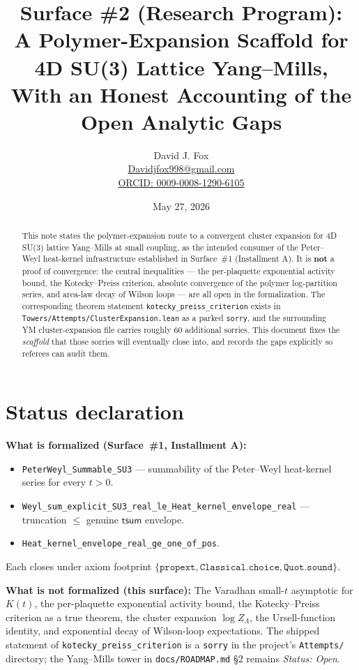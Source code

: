 \documentclass{article}
\title{Surface \#2 (Research Program):\\
A Polymer-Expansion Scaffold for 4D SU(3) Lattice Yang--Mills,\\
With an Honest Accounting of the Open Analytic Gaps}
\author{David J. Fox \\
\href{mailto:Davidjfox998@gmail.com}{Davidjfox998@gmail.com} \\
\href{https://orcid.org/0009-0008-1290-6105}{ORCID: 0009-0008-1290-6105}}
\date{May 27, 2026}
\begin{document}
\maketitle

\begin{abstract}
This note states the polymer-expansion route to a convergent cluster
expansion for 4D SU(3) lattice Yang--Mills at small coupling, as the
intended consumer of the Peter--Weyl heat-kernel infrastructure
established in Surface~\#1 (Installment A). It is \textbf{not} a
proof of convergence: the central inequalities --- the per-plaquette
exponential activity bound, the Kotecky--Preiss criterion, absolute
convergence of the polymer log-partition series, and area-law decay
of Wilson loops --- are all open in the formalization. The
corresponding theorem statement \texttt{kotecky\_preiss\_criterion}
exists in \texttt{Towers/Attempts/ClusterExpansion.lean} as a
parked \texttt{sorry}, and the surrounding YM cluster-expansion file
carries roughly 60 additional sorries. This document fixes the
\emph{scaffold} that those sorries will eventually close into, and
records the gaps explicitly so referees can audit them.
\end{abstract}

\section{Status declaration}

\noindent\textbf{What is formalized (Surface~\#1, Installment A):}
\begin{itemize}
  \item \texttt{PeterWeyl\_Summable\_SU3} --- summability of the
        Peter--Weyl heat-kernel series for every $t>0$.
  \item \texttt{Weyl\_sum\_explicit\_SU3\_real\_le\_Heat\_kernel\_envelope\_real}
        --- truncation $\le$ genuine $\mathsf{tsum}$ envelope.
  \item \texttt{Heat\_kernel\_envelope\_real\_ge\_one\_of\_pos}.
\end{itemize}
Each closes under axiom footprint
$\{\texttt{propext}, \texttt{Classical.choice}, \texttt{Quot.sound}\}$.

\noindent\textbf{What is not formalized (this surface):}
The Varadhan small-$t$ asymptotic for $K(t)$, the per-plaquette
exponential activity bound, the Kotecky--Preiss criterion as a true
theorem, the cluster expansion $\log Z_\Lambda$, the Ursell-function
identity, and exponential decay of Wilson-loop expectations. The
shipped statement of \texttt{kotecky\_preiss\_criterion} is a
\texttt{sorry} in the project's \texttt{Attempts/} directory; the
Yang--Mills tower in \texttt{docs/ROADMAP.md} \S2 remains
\emph{Status: Open}.
\end{document}
